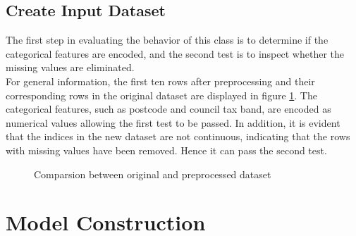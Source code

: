 \documentclass[12pt,twoside]{report}
\begin{document}
\subsection{Create Input Dataset}
The first step in evaluating the behavior of this class is to determine if the categorical features are encoded, and the second test is to inspect whether the missing values are eliminated.
\\

For general information, the first ten rows after preprocessing and their corresponding rows in the original dataset are displayed in figure \ref{general_info}. The categorical features, such as postcode and council tax band, are encoded as numerical values allowing the first test to be passed. In addition, it is evident that the indices in the new dataset are not continuous, indicating that the rows with missing values have been removed. Hence it can pass the second test. 

\begin{figure}[!htbp]
	\centering
	\caption{Comparsion between original and preprocessed dataset}
	\label{general_info}
\end{figure}

\section{Model Construction}
\end{document}
